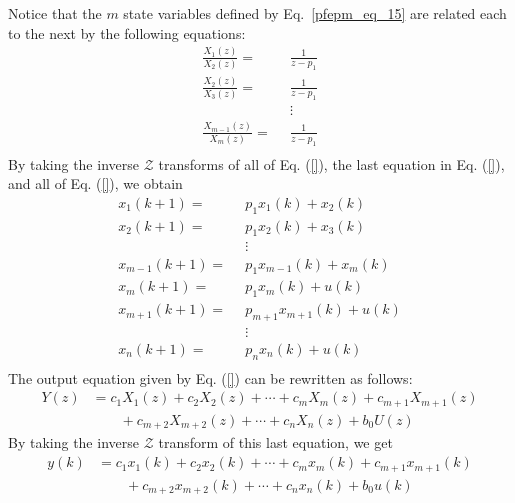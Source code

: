 \documentclass[11pt,a4paper,oneside]{book}
\numberwithin{equation}{section}
\theoremstyle{it}
\theoremstyle{definition}
\begin{document}
Notice that the $m$ state variables defined by Eq.~\eqref{pfepm_eq_15} are 
related each to the next by the following equations:
\begin{equation}\label{pfepm_eq_16}
	\begin{aligned}
		\frac{X_{1}(z)}{X_2(z)}= & \enspace  \frac{1}{z-p_{1}} \\[6pt]
		\frac{X_{2}(z)}{X_3(z)}= & \enspace  \frac{1}{z-p_{1}} \\[6pt]
		& \enspace \vdots \\[6pt]
		\frac{X_{m-1}(z)}{X_m(z)}= & \enspace  \frac{1}{z-p_{1}} \\[6pt]
	\end{aligned}
\end{equation}
By taking the inverse $\mathcal{Z}$ transforms of all of Eq. (\ref{}), the 
last equation in Eq. (\ref{}), and all of Eq. (\ref{}), we obtain
\begin{equation}\label{pfepm_eq_17}
	\begin{aligned}
		x_1(k+1) =& \enspace p_1x_1(k) + x_2(k) \\[6pt]
		x_2(k+1) =& \enspace p_1x_2(k) + x_3(k) \\[6pt]
		& \enspace\vdots \\[6pt]
		x_{m-1}(k+1) =& \enspace p_1x_{m-1}(k) + x_m(k) \\[6pt]
		x_{m}(k+1) =& \enspace p_1x_{m}(k) + u(k) \\[6pt]
		x_{m+1}(k+1) =& \enspace p_{m+1}x_{m+1}(k) + u(k) \\[6pt]
		& \enspace\vdots \\[6pt]
		x_{n}(k+1) =& \enspace p_{n}x_{n}(k) + u(k) \\[6pt]
	\end{aligned}
\end{equation}
The output equation given by Eq. (\ref{}) can be rewritten as follows:
\begin{equation*}\label{pfepm_eq_18}
	\begin{aligned}
		Y(z) &= c_1 X_1(z) + c_2 X_2(z) + \cdots+c_mX_m(z)+c_{m+1}X_{m+1}(z)\\[6pt]
		& \quad \quad + c_{m+2}X_{m+2}(z)+\cdots+c_nX_n(z)+b_0U(z)
	\end{aligned}
\end{equation*}
By taking the inverse $\mathcal{Z}$ transform of this last equation, we get 
\begin{equation}\label{pfepm_eq_19}
	\begin{aligned}
		y(k) &= c_1 x_1(k) + c_2 x_2(k) + \cdots+c_mx_m(k)+c_{m+1}x_{m+1}(k)\\[6pt]
		& \quad \quad + c_{m+2}x_{m+2}(k)+\cdots+c_nx_n(k)+b_0u(k)
	\end{aligned}
\end{equation}
\end{document}
